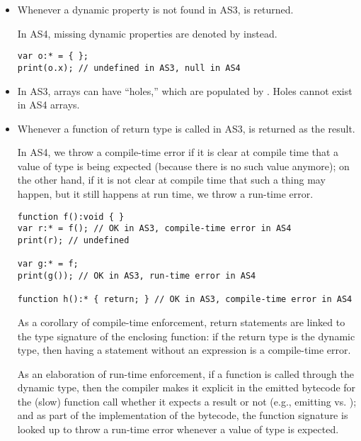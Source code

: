 \begin{itemize}

\item Whenever a dynamic property is not found in AS3,  is returned.

In AS4, missing dynamic properties are denoted by  instead.

\begin{verbatim}
var o:* = { };
print(o.x); // undefined in AS3, null in AS4
\end{verbatim}

\item In AS3, arrays can have ``holes,'' which are populated by
  . Holes cannot exist in AS4 arrays.

\item Whenever a function of return type  is called in AS3,
   is returned as the result.

In AS4, we throw a compile-time error if it is clear at compile time that a
value of type  is being expected (because there is no such
value anymore); on the other hand, if it is not clear at compile time
that such a thing may happen, but
it still happens at run time, we throw a run-time error.

\begin{verbatim}
function f():void { }
var r:* = f(); // OK in AS3, compile-time error in AS4
print(r); // undefined

var g:* = f;
print(g()); // OK in AS3, run-time error in AS4

function h():* { return; } // OK in AS3, compile-time error in AS4
\end{verbatim}

As a corollary of compile-time enforcement, return statements are linked to the type signature
of the enclosing function: if the return type is the dynamic type,
then having a  statement without an expression is a
compile-time error.

As an elaboration of run-time enforcement, if a function is called through the
dynamic type, then the compiler makes it explicit in the emitted
bytecode for the (slow) function call whether it expects a result or
not (e.g., emitting  vs. ); and as part of the
implementation of the bytecode, the function signature is looked up to
throw a run-time error whenever a value of type  is
expected.

\end{itemize}

